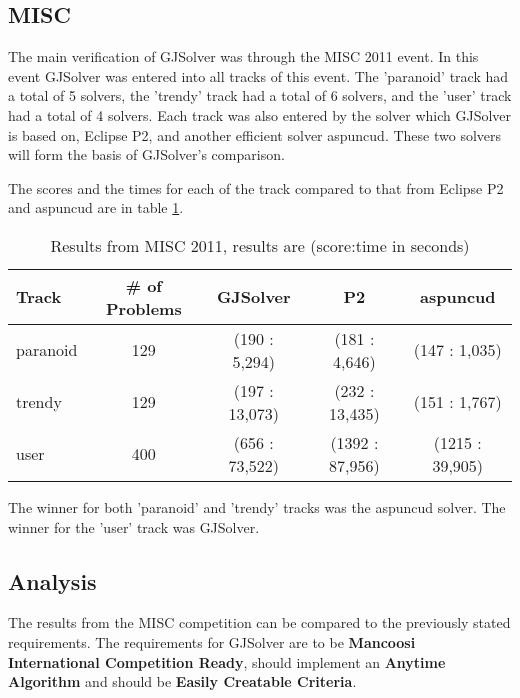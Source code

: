 \subsection{MISC}
The main verification of GJSolver was through the MISC 2011 event.
In this event GJSolver was entered into all tracks of this event.
The 'paranoid' track had a total of 5 solvers, the 'trendy' track had a total of 6 solvers, 
and the 'user' track had a total of 4 solvers.
Each track was also entered by the solver which GJSolver is based on, Eclipse P2, and another efficient solver aspuncud.
These two solvers will form the basis of GJSolver's comparison.

The scores and the times for each of the track compared to that from Eclipse P2 and aspuncud are in table \ref{impl.misc2011}.
\begin{table}
\begin{tabular}{| l | c | c | c | c |}\hline
Track & \# of Problems & GJSolver & P2 & aspuncud\\ \hline
paranoid & 129 & (190 : 5,294) & (181 : 4,646) & (147 : 1,035) \\ \hline
trendy & 129 & (197 : 13,073) & (232 : 13,435) & (151 : 1,767) \\ \hline
user & 400 & (656 : 73,522) & (1392 : 87,956) & (1215 : 39,905) \\ \hline
\end{tabular}
\caption{Results from MISC 2011, results are (score:time in seconds)}
\label{impl.misc2011}
\end{table}

The winner for both 'paranoid' and 'trendy' tracks was the aspuncud solver.
The winner for the 'user' track was GJSolver.

\subsection{Analysis}
The results from the MISC competition can be compared to the previously stated requirements.
The requirements for GJSolver are to be \textbf{Mancoosi International Competition Ready}, should implement an \textbf{Anytime Algorithm} and should be \textbf{Easily Creatable Criteria}.

